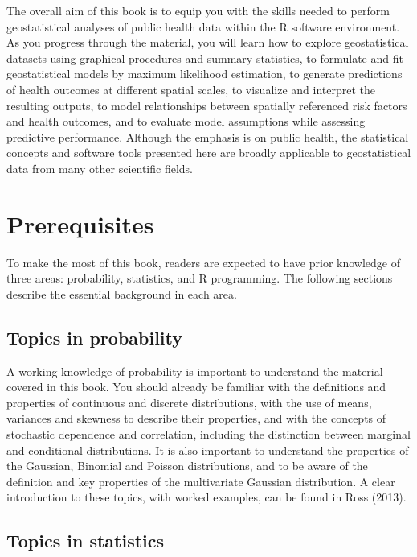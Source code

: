 \documentclass[
  letterpaper,
]{krantz}
\begin{document}
The overall aim of this book is to equip you with the skills needed to
perform geostatistical analyses of public health data within the R
software environment. As you progress through the material, you will
learn how to explore geostatistical datasets using graphical procedures
and summary statistics, to formulate and fit geostatistical models by
maximum likelihood estimation, to generate predictions of health
outcomes at different spatial scales, to visualize and interpret the
resulting outputs, to model relationships between spatially referenced
risk factors and health outcomes, and to evaluate model assumptions
while assessing predictive performance. Although the emphasis is on
public health, the statistical concepts and software tools presented
here are broadly applicable to geostatistical data from many other
scientific fields.

\section{Prerequisites}\label{prerequisites}

To make the most of this book, readers are expected to have prior
knowledge of three areas: probability, statistics, and R programming.
The following sections describe the essential background in each area.

\subsection{Topics in probability}\label{topics-in-probability}

A working knowledge of probability is important to understand the
material covered in this book. You should already be familiar with the
definitions and properties of continuous and discrete distributions,
with the use of means, variances and skewness to describe their
properties, and with the concepts of stochastic dependence and
correlation, including the distinction between marginal and conditional
distributions. It is also important to understand the properties of the
Gaussian, Binomial and Poisson distributions, and to be aware of the
definition and key properties of the multivariate Gaussian distribution.
A clear introduction to these topics, with worked examples, can be found
in Ross (2013).

\subsection{Topics in statistics}\label{topics-in-statistics}
\end{document}
